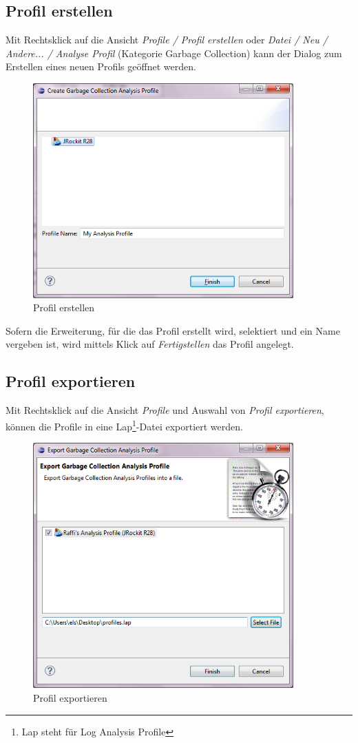 \subsection{Profil erstellen}
Mit Rechtsklick auf die Ansicht \textit{Profile / Profil erstellen} oder \textit{Datei / Neu / Andere... / Analyse Profil} (Kategorie Garbage Collection) kann der Dialog zum Erstellen eines neuen Profils geöffnet werden. 
 \begin{figure}[H]
  	\centering
    	\includegraphics[width=10cm]{images/tutorial_newprofile}
        	\caption{Profil erstellen}
\end{figure}
Sofern die Erweiterung, für die das Profil erstellt wird, selektiert und ein Name vergeben ist, wird mittels Klick auf \textit{Fertigstellen} das Profil angelegt.

\subsection{Profil exportieren}
Mit Rechtsklick auf die Ansicht \textit{Profile} und Auswahl von \textit{Profil exportieren}, können die Profile in eine Lap\footnote{Lap steht für Log Analysis Profile}-Datei exportiert werden.
 \begin{figure}[H]
  	\centering
    	\includegraphics[width=10cm]{images/tutorial_exportprofile}
        	\caption{Profil exportieren}
\end{figure}

